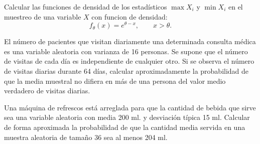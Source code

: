\begin{ejercicio}
    Calcular las funciones de densidad de los estadísticos $\max X_i$ y $\min X_i$ en el muestreo de una variable $X$ con funcion de densidad:
    \begin{equation*}
        f_\theta(x) = e^{\theta-x}, \qquad x>\theta.
    \end{equation*}
\end{ejercicio}

\begin{ejercicio}
    El número de pacientes que visitan diariamente una determinada consulta médica es una variable aleatoria con varianza de 16 personas. Se supone que el número de visitas de cada día es independiente de cualquier otro. Si se observa el número de visitas diarias durante 64 días, calcular aproximadamente la probabilidad de que la media muestral no difiera en más de una persona del valor medio verdadero de visitas diarias.
\end{ejercicio}

\begin{ejercicio}
    Una máquina de refrescos está arreglada para que la cantidad de bebida que sirve sea una variable aleatoria con media 200 ml. y desviación típica 15 ml. Calcular de forma aproximada la probabilidad de que la cantidad media servida en una muestra aleatoria de tamaño 36 sea al menos 204 ml.
\end{ejercicio}

